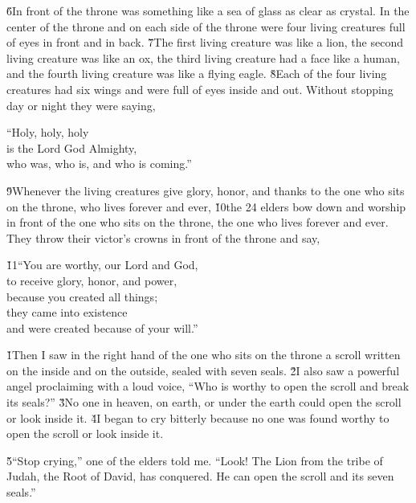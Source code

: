 \v{6}In front of the throne was something like a sea of glass as clear as crystal. In the center of the throne and on each side of the throne were four living creatures full of eyes in front and in back. \v{7}The first living creature was like a lion, the second living creature was like an ox, the third living creature had a face like a human, and the fourth living creature was like a flying eagle. \v{8}Each of the four living creatures had six wings and were full of eyes inside and out. Without stopping day or night they were saying,

\begin{poetry}
\poeml ``Holy, holy, holy \\
\poemll    is the Lord God Almighty, \\
\poemlll       who was, who is, and who is coming.''
\end{poetry}

\v{9}Whenever the living creatures give glory, honor, and thanks to the one who sits on the throne, who lives forever and ever, \v{10}the 24 elders bow down and worship in front of the one who sits on the throne, the one who lives forever and ever. They throw their victor's crowns in front of the throne and say,

\begin{poetry}
\poeml \v{11}``You are worthy, our Lord and God, \\
\poemll    to receive glory, honor, and power, \\
\poemlll       because you created all things; \\
\poeml they came into existence \\
\poeml and were created because of your will.''
\end{poetry}

\v{1}Then I saw in the right hand of the one who sits on the throne a scroll written on the inside and on the outside, sealed with seven seals. \v{2}I also saw a powerful angel proclaiming with a loud voice, ``Who is worthy to open the scroll and break its seals?'' \v{3}No one in heaven, on earth, or under the earth could open the scroll or look inside it. \v{4}I began to cry bitterly because no one was found worthy to open the scroll or look inside it.

\v{5}``Stop crying,'' one of the elders told me. ``Look! The Lion from the tribe of Judah, the Root of David, has conquered. He can open the scroll and its seven seals.''

